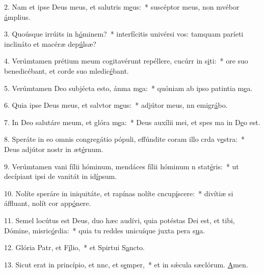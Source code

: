 2. Nam et ipse Deus meus, et salutris m\uline{e}us:~* suscéptor meus, non mvébor \uline{á}mplius.\par 
3. Quoúsque irrúits in h\uline{ó}minem?~* interfícitis univérsi vos: tamquam paríeti inclináto et macéræ dep\uline{ú}lsæ?\par 
4. Verúmtamen prétium meum cogitavérunt repéllere, cucúrr in s\uline{i}ti:~* ore suo benedicébant, et corde suo mledic\uline{é}bant.\par 
5. Verúmtamen Deo subjécta esto, ánma m\uline{e}a:~* quóniam ab ipso patintia m\uline{e}a.\par 
6. Quia ipse Deus meus, et salvtor m\uline{e}us:~* adjútor meus, nn emigr\uline{á}bo.\par 
7. In Deo salutáre meum, et glóra m\uline{e}a:~* Deus auxílii mei, et spes ma in D\uline{e}o est.\par 
8. Speráte in eo omnis congregátio pópuli, effúndite coram illo crda v\uline{e}stra:~* Deus adjútor nostr in æt\uline{é}rnum.\par 
9. Verúmtamen vani fílii hóminum, mendáces fílii hóminum n stat\uline{é}ris:~* ut decípiant ipsi de vanitát in id\uline{í}psum.\par 
10. Nolíte speráre in iniquitáte, et rapínas nolíte cncup\uline{í}scere:~* divítiæ si áffluant, nolít cor app\uline{ó}nere.\par 
11. Semel locútus est Deus, duo hæc audívi, quia potéstas Dei est, et tibi, Dómine, misric\uline{ó}rdia:~* quia tu reddes unicuíque juxta pera s\uline{u}a.\par 
12. Glória Patr, et F\uline{í}lio,~* et Spirtui S\uline{a}ncto.\par 
13. Sicut erat in princípio, et nnc, et s\uline{e}mper,~* et in sǽcula sæclórum. \uline{A}men.\par 
